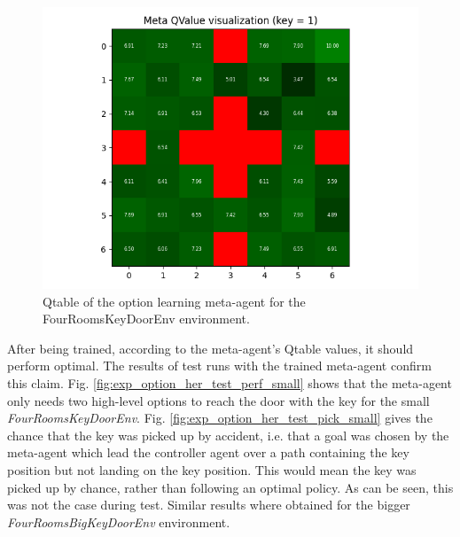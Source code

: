 \documentclass[conference]{IEEEtran}
\begin{document}
\begin{figure}[ht]
\centering
\includegraphics[width=0.9\columnwidth]{img/exp_option_her_qtable_small_key1.png}
\caption{Qtable of the option learning meta-agent for the FourRoomsKeyDoorEnv environment.}
\label{fig:exp_option_her_qtable_small_key1}
\end{figure}

After being trained, according to the meta-agent's Qtable values, it should perform optimal. The results of test runs with the trained meta-agent confirm this claim. Fig. \ref{fig:exp_option_her_test_perf_small} shows that the meta-agent only needs two high-level options to reach the door with the key for the small \textit{FourRoomsKeyDoorEnv}. Fig. \ref{fig:exp_option_her_test_pick_small} gives the chance that the key was picked up by accident, i.e. that a goal was chosen by the meta-agent which lead the controller agent over a path containing the key position but not landing on the key position. This would mean the key was picked up by chance, rather than following an optimal policy. As can be seen, this was not the case during test. Similar results where obtained for the bigger  \textit{FourRoomsBigKeyDoorEnv} environment.
\end{document}
